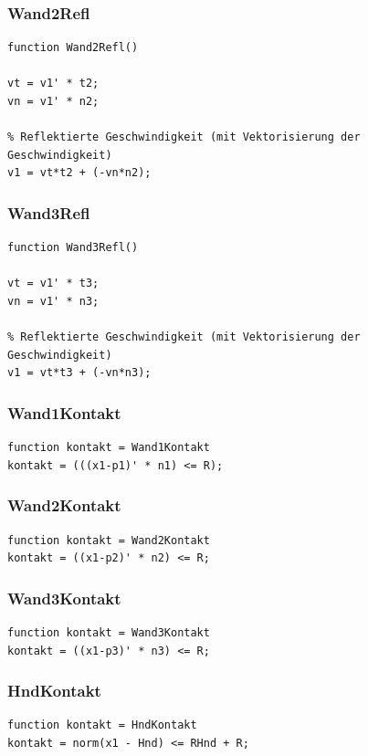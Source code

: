 \documentclass[]{scrartcl}
\begin{document}
\subsubsection{Wand2Refl}
\begin{lstlisting}
function Wand2Refl()

vt = v1' * t2;
vn = v1' * n2;

% Reflektierte Geschwindigkeit (mit Vektorisierung der Geschwindigkeit)
v1 = vt*t2 + (-vn*n2); 
\end{lstlisting}

\subsubsection{Wand3Refl}
\begin{lstlisting}
function Wand3Refl()

vt = v1' * t3;
vn = v1' * n3;

% Reflektierte Geschwindigkeit (mit Vektorisierung der Geschwindigkeit)
v1 = vt*t3 + (-vn*n3); 
\end{lstlisting}

\subsubsection{Wand1Kontakt}
\begin{lstlisting}
function kontakt = Wand1Kontakt
kontakt = (((x1-p1)' * n1) <= R);
\end{lstlisting}

\subsubsection{Wand2Kontakt}
\begin{lstlisting}
function kontakt = Wand2Kontakt
kontakt = ((x1-p2)' * n2) <= R;
\end{lstlisting}

\subsubsection{Wand3Kontakt}
\begin{lstlisting}
function kontakt = Wand3Kontakt
kontakt = ((x1-p3)' * n3) <= R;
\end{lstlisting}

\subsubsection{HndKontakt}
\begin{lstlisting}
function kontakt = HndKontakt
kontakt = norm(x1 - Hnd) <= RHnd + R;
\end{lstlisting}
\end{document}
